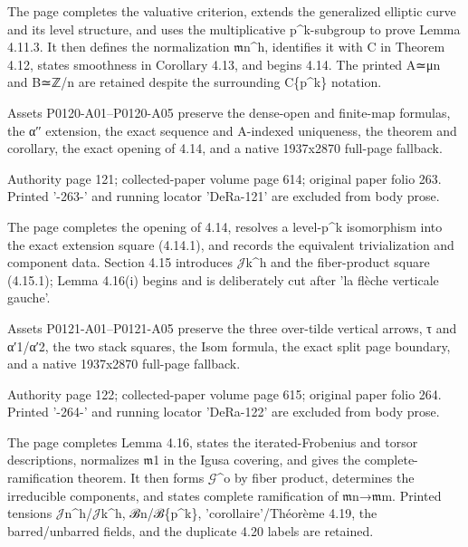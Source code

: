 \documentclass[11pt,a4paper]{article}
\begin{document}
The page completes the valuative criterion, extends the generalized elliptic curve and its level structure, and uses the multiplicative p\textasciicircum{}k-subgroup to prove Lemma 4.11.3. It then defines the normalization \ensuremath{\mathfrak{m}}\textunderscore{}n\textasciicircum{}h, identifies it with C in Theorem 4.12, states smoothness in Corollary 4.13, and begins 4.14. The printed A≃μ\textunderscore{}n and B≃ℤ/n are retained despite the surrounding C\textunderscore{}\{p\textasciicircum{}k\} notation.

Assets P0120-A01--P0120-A05 preserve the dense-open and finite-map formulas, the α′′ extension, the exact sequence and A-indexed uniqueness, the theorem and corollary, the exact opening of 4.14, and a native 1937x2870 full-page fallback.


\par\medskip
\hypertarget{D018-P0121}{}
\par\smallskip
Authority page 121; collected-paper volume page 614; original paper folio 263. Printed '-263-' and running locator 'DeRa-121' are excluded from body prose.

The page completes the opening of 4.14, resolves a level-p\textasciicircum{}k isomorphism into the exact extension square (4.14.1), and records the equivalent trivialization and component data. Section 4.15 introduces \ensuremath{\mathcal{J}}\textunderscore{}k\textasciicircum{}h and the fiber-product square (4.15.1); Lemma 4.16(i) begins and is deliberately cut after 'la flèche verticale gauche'.

Assets P0121-A01--P0121-A05 preserve the three over-tilde vertical arrows, τ and α′\textunderscore{}1/α′\textunderscore{}2, the two stack squares, the Isom formula, the exact split page boundary, and a native 1937x2870 full-page fallback.


\par\medskip
\hypertarget{D018-P0122}{}
\par\smallskip
Authority page 122; collected-paper volume page 615; original paper folio 264. Printed '-264-' and running locator 'DeRa-122' are excluded from body prose.

The page completes Lemma 4.16, states the iterated-Frobenius and torsor descriptions, normalizes \ensuremath{\mathfrak{m}}\textunderscore{}1 in the Igusa covering, and gives the complete-ramification theorem. It then forms \ensuremath{\mathcal{G}}\textasciicircum{}o by fiber product, determines the irreducible components, and states complete ramification of \ensuremath{\mathfrak{m}}\textunderscore{}n→\ensuremath{\mathfrak{m}}\textunderscore{}m. Printed tensions \ensuremath{\mathcal{J}}\textunderscore{}n\textasciicircum{}h/\ensuremath{\mathcal{J}}\textunderscore{}k\textasciicircum{}h, ℬ\textunderscore{}n/ℬ\textunderscore{}\{p\textasciicircum{}k\}, 'corollaire'/Théorème 4.19, the barred/unbarred fields, and the duplicate 4.20 labels are retained.
\end{document}
